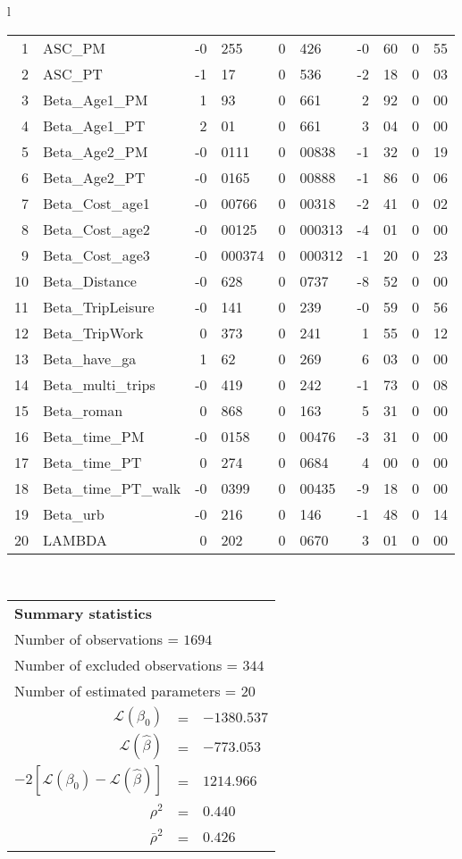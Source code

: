 \begin{tabular}{l}
\begin{tabular}{rlr@{.}lr@{.}lr@{.}lr@{.}l}
1 & ASC_PM  & -0&255 & 0&426 & -0&60 & 0&55\\
2 & ASC_PT & -1&17 & 0&536 & -2&18 & 0&03\\
3 & Beta_Age1_PM & 1&93 & 0&661 & 2&92 & 0&00\\
4 & Beta_Age1_PT & 2&01 & 0&661 & 3&04 & 0&00\\
5 & Beta_Age2_PM & -0&0111 & 0&00838 & -1&32 & 0&19\\
6 & Beta_Age2_PT & -0&0165 & 0&00888 & -1&86 & 0&06\\
7 & Beta_Cost_age1 & -0&00766 & 0&00318 & -2&41 & 0&02\\
8 & Beta_Cost_age2 & -0&00125 & 0&000313 & -4&01 & 0&00\\
9 & Beta_Cost_age3 & -0&000374 & 0&000312 & -1&20 & 0&23\\
10 & Beta_Distance & -0&628 & 0&0737 & -8&52 & 0&00\\
11 & Beta_TripLeisure & -0&141 & 0&239 & -0&59 & 0&56\\
12 & Beta_TripWork & 0&373 & 0&241 & 1&55 & 0&12\\
13 & Beta_have_ga & 1&62 & 0&269 & 6&03 & 0&00\\
14 & Beta_multi_trips & -0&419 & 0&242 & -1&73 & 0&08\\
15 & Beta_roman & 0&868 & 0&163 & 5&31 & 0&00\\
16 & Beta_time_PM & -0&0158 & 0&00476 & -3&31 & 0&00\\
17 & Beta_time_PT & 0&274 & 0&0684 & 4&00 & 0&00\\
18 & Beta_time_PT_walk & -0&0399 & 0&00435 & -9&18 & 0&00\\
19 & Beta_urb & -0&216 & 0&146 & -1&48 & 0&14\\
20 & LAMBDA & 0&202 & 0&0670 & 3&01 & 0&00\\
\hline
\end{tabular}
\\
\begin{tabular}{rcl}
\multicolumn{3}{l}{\bf Summary statistics}\\
\multicolumn{3}{l}{ Number of observations = $1694$} \\
\multicolumn{3}{l}{ Number of excluded observations = $344$} \\
\multicolumn{3}{l}{ Number of estimated  parameters = $20$} \\
 $\mathcal{L}(\beta_0)$ &=&  $-1380.537$ \\
 $\mathcal{L}(\hat{\beta})$ &=& $-773.053 $  \\
 $-2[\mathcal{L}(\beta_0) -\mathcal{L}(\hat{\beta})]$ &=& $1214.966$ \\
    $\rho^2$ &=&   $0.440$ \\
    $\bar{\rho}^2$ &=&    $0.426$ \\
\end{tabular}
  \end{tabular}
